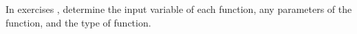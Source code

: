 {In exercises}
{, determine the input variable of each function, any parameters of the function, and the type of function.}
